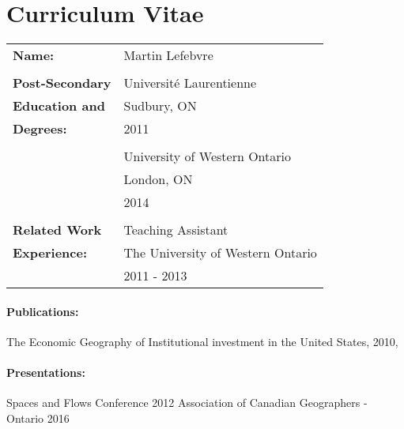 \documentclass[12pt,letterpaper]{book}
\numberwithin{figure}{chapter}
\newcommand{\firstname}{Martin}
\newcommand{\lastname}{Lefebvre}
\begin{document}
\chapter*{Curriculum Vitae}
\begin{table}[ht]
\begin{tabular}{ll}
\textbf{Name:} & \firstname{} \lastname\\\\
\textbf{Post-Secondary} & Universit\'{e} Laurentienne\\
\textbf{Education and}& Sudbury, ON\\
\textbf{Degrees:}& 2011\\\\
& University of Western Ontario\\
& London, ON\\
& 2014 \\\\
\textbf{Related Work}& Teaching Assistant\\
\textbf{Experience:}& The University of Western Ontario\\
& 2011 - 2013\\
\end{tabular}
\end{table}
\subsubsection*{Publications:}
The Economic Geography of Institutional investment in the United States, 2010, 

\subsubsection*{Presentations:}
Spaces and Flows Conference 2012 \newline
Association of Canadian Geographers - Ontario 2016
\end{document}
